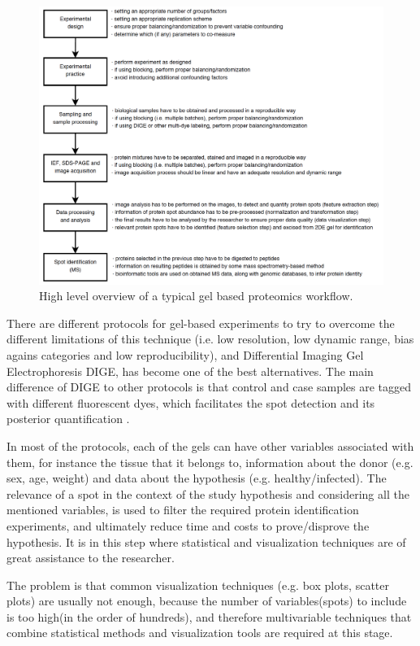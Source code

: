 \begin{figure}  
\centering
\includegraphics[width=\textwidth]{figures/gel-based.png}
\caption[High level overview of a typical gel based proteomics workflow.]{High level overview of a typical gel based proteomics workflow.
\label{fig:gelflow}}
\end{figure}

There are different protocols for gel-based experiments to try to overcome the different limitations of this technique (i.e. low resolution, low dynamic range, bias agains categories and low reproducibility), and Differential Imaging Gel Electrophoresis DIGE, has become one of the best alternatives. The main difference of DIGE to other protocols is that control and case samples are tagged with different fluorescent dyes, which facilitates the spot detection and its posterior quantification \cite{PAN2008}.

In most of the protocols, each of the gels can have other variables associated with them, for instance the tissue that it belongs to, information about the donor (e.g. sex, age, weight) and data about the hypothesis (e.g. healthy/infected). The relevance of a spot in the context of the study hypothesis and considering all the mentioned variables, is used to filter the required protein identification experiments, and ultimately reduce time and costs to prove/disprove the hypothesis. It is in this step where statistical and visualization techniques are of great assistance to the researcher.

The problem is that common visualization techniques (e.g. box plots, scatter plots) are usually not enough, because the number of variables(spots) to include is too high(in the order of hundreds), and therefore multivariable techniques that combine statistical methods and visualization tools are required at this stage.

